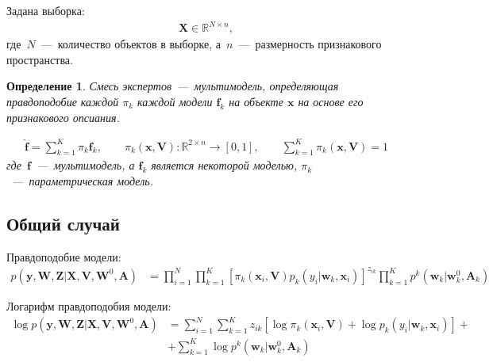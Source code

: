 \documentclass[12pt, twoside]{article}
\newtheorem{definition}{Определение}[section]
\numberwithin{equation}{section}
\begin{document}
Задана выборка:
\begin{equation}
\label{eq:st:1}
\begin{aligned}
\textbf{X} \in \mathbb{R}^{N \times n},
\end{aligned}
\end{equation}
где~$N$~---~количество объектов в выборке, а~$n$~---~размерность признакового пространства.

\begin{definition}
Смесь экспертов~---~мультимодель, определяющая правдоподобие каждой $\pi_k$ каждой модели $\textbf{f}_k$ на объекте $\textbf{x}$ на основе его признакового опсиания.

\begin{equation}
\label{eq:st:2}
\begin{aligned}
\hat{\textbf{f}} = \sum_{k=1}^{K}\pi_{k}\textbf{f}_k, \qquad \pi_{k}\left(\textbf{x}, \textbf{V}\right):\mathbb{R}^{2\times n} \to [0, 1], \qquad \sum_{k=1}^{K}\pi_{k}\left(\textbf{x}, \textbf{V}\right) = 1
\end{aligned}
\end{equation}
где~$\textbf{f}$~---~мультимодель, а $\textbf{f}_k$ является некоторой моделью, $\pi_k$~---~параметрическая модель.
\end{definition}

\subsection{Общий случай}

Правдоподобие модели:
\begin{equation}
\label{eq:st:3}
\begin{aligned}
p\left(\textbf{y}, \textbf{W}, \textbf{Z}|\textbf{X}, \textbf{V}, \textbf{W}^{0}, \textbf{A}\right) &= \prod_{i=1}^{N}\prod_{k=1}^{K}\left[\pi_{k}\left(\textbf{x}_i,\textbf{V}\right)p_k\left(y_i|\textbf{w}_{k}, \textbf{x}_i\right)\right]^{z_{ik}}\prod_{k=1}^{K}p^{k}\left(\textbf{w}_{k}|\textbf{w}^{0}_{k}, \textbf{A}_{k}\right)
\end{aligned}
\end{equation}

Логарифм правдоподобия модели:
\begin{equation}
\label{eq:st:4}
\begin{aligned}
\log p\left(\textbf{y}, \textbf{W}, \textbf{Z}|\textbf{X}, \textbf{V}, \textbf{W}^{0}, \textbf{A}\right) &= \sum_{i=1}^{N}\sum_{k=1}^{K}z_{ik}\left[\log\pi_k\left(\textbf{x}_i, \textbf{V}\right) + \log p_k\left(y_i|\textbf{w}_{k}, \textbf{x}_{i}\right)\right] +\\
&+ \sum_{k=1}^{K}\log p^{k}\left(\textbf{w}_{k}|\textbf{w}^{0}_{k}, \textbf{A}_{k}\right)
\end{aligned}
\end{equation}
\end{document}
